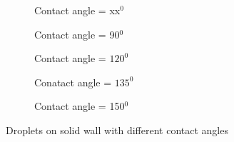 \documentclass{article}
\begin{document}
\begin{figure}[h!]
 	\begin{subfigure}[h!]{2cm}
 		\caption{Contact angle = xx$ ^{0} $}
 	\end{subfigure}
 	\begin{subfigure}[h!]{2cm}            
 		\caption{Contact angle = 90$ ^{0} $}
 		\label{Fig:Datsa1}
 	\end{subfigure}
 	\begin{subfigure}[h!]{2cm}            
 		\caption{Contact angle = $ 120^{0} $}
 		\label{Fig:Datsase3}
 	\end{subfigure}
 	\begin{subfigure}[h!]{2cm}
 		\caption{Conatact angle = $ 135^{0} $}
 	\end{subfigure}
 	\begin{subfigure}[h!]{2.5cm}
	 	\caption{Contact angle = 150$ ^{0} $}
	\end{subfigure}
 	\caption{Droplets on solid wall with different contact angles }
 	\label{fig:spinods}
 \end{figure}
\end{document}
